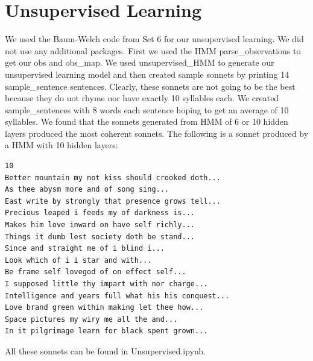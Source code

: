 \section{Unsupervised Learning}
\medskip
We used the Baum-Welch code from Set 6 for our unsupervised learning. We did not use any additional packages. First we used the HMM parse_observations to get our obs and obs_map. We used unsupervised_HMM to generate our unsupervised learning model and then created sample sonnets by printing 14 sample_sentence sentences. Clearly, these sonnets are not going to be the best because they do not rhyme nor have exactly 10 syllables each. We created sample_sentences with 8 words each sentence hoping to get an average of 10 syllables. We found that the sonnets generated from HMM of 6 or 10 hidden layers produced the most coherent sonnets. The following is a sonnet produced by a HMM with 10 hidden layers: \newline

\begin{verbatim}
10
Better mountain my not kiss should crooked doth...
As thee abysm more and of song sing...
East write by strongly that presence grows tell...
Precious leaped i feeds my of darkness is...
Makes him love inward on have self richly...
Things it dumb lest society doth be stand...
Since and straight me of i blind i...
Look which of i i star and with...
Be frame self lovegod of on effect self...
I supposed little thy impart with nor charge...
Intelligence and years full what his his conquest...
Love brand green within making let thee how...
Space pictures my wiry me all the and...
In it pilgrimage learn for black spent grown...
\end{verbatim}

All these sonnets can be found in Unsupervised.ipynb.

\newpage

